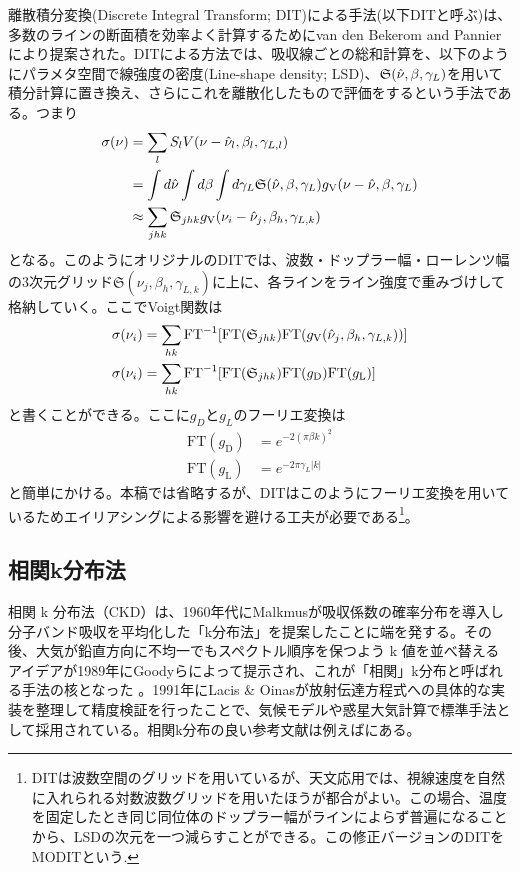 離散積分変換(Discrete Integral Transform; DIT)による手法(以下DITと呼ぶ)は、多数のラインの断面積を効率よく計算するためにvan den Bekerom and Pannier \cite{van2021discrete}により提案された。DITによる方法では、吸収線ごとの総和計算を、以下のようにパラメタ空間で線強度の密度(Line-shape density; LSD)、$\mathfrak{S}(\hat{\nu},\beta,\gamma_L)$を用いて積分計算に置き換え、さらにこれを離散化したもので評価をするという手法である。つまり
\begin{align}
\sigma (\nu) &= \sum_l S_l V(\nu - \hat{\nu}_l, \beta_l, \gamma_{L,l}) \\
&= \int d \hat{\nu} \int d \beta \int d \gamma_L  \mathfrak{S}(\hat{\nu},\beta,\gamma_L) g_\mathrm{V}(\nu - \hat{\nu}, \beta, \gamma_{L})\\
&\approx \sum_{jhk} \mathfrak{S}_{jhk} g_\mathrm{V}(\nu_i - \hat{\nu}_j, \beta_h, \gamma_{L,k}) 
\label{eq:FTFT}
\end{align}
となる。このようにオリジナルのDITでは、波数・ドップラー幅・ローレンツ幅の3次元グリッド$\mathfrak{S} (\nu_j, \beta_h,\gamma_{L,k})$に上に、各ラインをライン強度で重みづけして格納していく。ここでVoigt関数は
\begin{align}
\sigma (\nu_i) &= \sum_{hk} \mathrm{FT}^{-1} [ \mathrm{FT} (\mathfrak{S}_{jhk})  \mathrm{FT} (g_\mathrm{V} (\hat{\nu}_j, \beta_h, \gamma_{L,k})) ] \\
\sigma (\nu_i) &= \sum_{hk} \mathrm{FT}^{-1} [ \mathrm{FT} (\mathfrak{S}_{jhk})  \mathrm{FT} (g_\mathrm{D} ) \mathrm{FT} (g_\mathrm{L})] 
\end{align}
と書くことができる。ここに$g_D$と$g_L$のフーリエ変換は
\begin{align}
\mathrm{FT} (g_\mathrm{D} ) &= e^{-2 (\pi \beta k)^2 }\\
\mathrm{FT} (g_\mathrm{L})  &= e^{-2 \pi \gamma_L |k| }
\end{align}
と簡単にかける。本稿では省略するが、DITはこのようにフーリエ変換を用いているためエイリアシングによる影響を避ける工夫が必要である\footnote{DITは波数空間のグリッドを用いているが、天文応用では、視線速度を自然に入れられる対数波数グリッドを用いたほうが都合がよい。この場合、温度を固定したとき同じ同位体のドップラー幅がラインによらず普遍になることから、LSDの次元を一つ減らすことができる。この修正バージョンのDITをMODITという.}。

\subsection*{相関k分布法}

相関 k 分布法（CKD）は、1960年代にMalkmusが吸収係数の確率分布を導入し分子バンド吸収を平均化した「k分布法」を提案したことに端を発する\cite{malkmus1967random}。その後、大気が鉛直方向に不均一でもスペクトル順序を保つよう k 値を並べ替えるアイデアが1989年にGoodyらによって提示され、これが「相関」k分布と呼ばれる手法の核となった \cite{1989JQSRT..42..539G}。1991年にLacis \& Oinasが放射伝達方程式への具体的な実装を整理して精度検証を行ったことで、気候モデルや惑星大気計算で標準手法として採用されている\cite{1991JGR....96.9027L}。相関k分布の良い参考文献は例えば\cite{liou2002introduction}にある。

